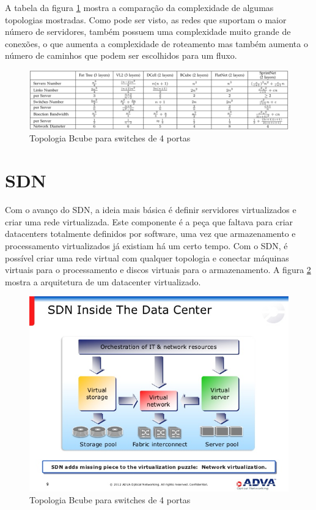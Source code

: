 \documentclass[12pt,a4paper]{report}
\begin{document}
A tabela da figura \ref{comparacao} mostra a comparação da complexidade de algumas topologias mostradas. Como pode ser visto, as redes que suportam o maior número de servidores, também possuem uma complexidade muito grande de conexões, o que aumenta a complexidade de roteamento mas também aumenta o número de caminhos que podem ser escolhidos para um fluxo.\\

\begin{figure}[H]
\centering
\includegraphics[width=1.1\textwidth]{imagens/tabela.png}
\caption{Topologia Bcube para switches de 4 portas}
\label{comparacao}
\end{figure}

\section{SDN}

Com o avanço do SDN, a ideia mais básica é definir servidores virtualizados e criar uma rede virtualizada. Este componente é a peça que faltava para criar datacenters totalmente definidos por software, uma vez que armazenamento e processamento virtualizados já existiam há um certo tempo. Com o SDN, é possível criar uma rede virtual com qualquer topologia e conectar máquinas virtuais para o processamento e discos virtuais para o armazenamento. A figura \ref{sdn} mostra a arquitetura de um datacenter virtualizado.\\

\begin{figure}[H]
\centering
\includegraphics[width=.8\textwidth]{imagens/inside-sdn.jpg}
\caption{Topologia Bcube para switches de 4 portas}
\label{sdn}
\end{figure}
\end{document}
